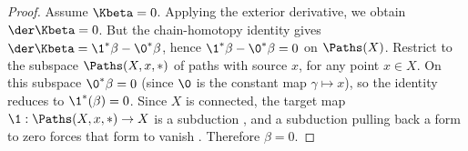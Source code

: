 \begin{proof}
  Assume $\Kbeta = 0$.
  Applying the exterior derivative,
  we obtain $\der\Kbeta = 0$.
  But the chain-homotopy identity gives $\der\Kbeta = \1^*\beta - \0^*\beta$,
  hence $\1^*\beta - \0^*\beta = 0$ on $\Paths(X)$.
  Restrict to the subspace $\Paths(X,x,\ast)$ of paths with source $x$,
  for any point $x \in X$.
  On this subspace $\0^*\beta = 0$ (since $\0$ is the constant map $\gamma \mapsto x$),
  so the identity reduces to $\1^*(\beta) = 0$.
  Since $X$ is connected,
  the target map $\1: \Paths(X,x,\ast) \to X$ is a subduction
  \cite[]{PIZ13},
  and a subduction pulling back a form to zero forces that form to vanish
  \cite[]{PIZ13}.
  Therefore $\beta = 0$.
\end{proof}

